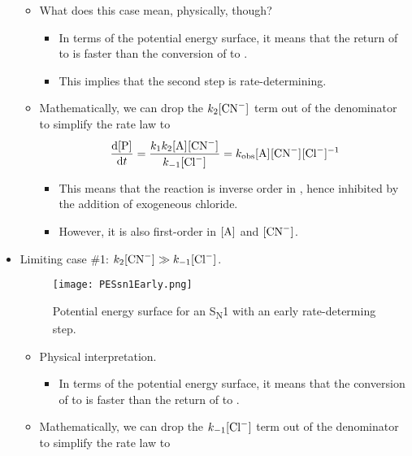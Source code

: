 \documentclass[../notes.tex]{subfiles}
\begin{document}
\begin{itemize}
\begin{figure}[H]
        \label{fig:PESsn1Late}
    \end{figure}
    \begin{itemize}
        \item What does this case mean, physically, though?
        \begin{itemize}
            \item In terms of the potential energy surface, it means that the return of  to  is faster than the conversion of  to .
            \item This implies that the second step is rate-determining.
        \end{itemize}
        \item Mathematically, we can drop the $k_2\cnc{CN-}$ term out of the denominator to simplify the rate law to
        \begin{equation*}
            \dv{\cnc{P}}{t} = \frac{k_1k_2\cnc{A}\cnc{CN-}}{k_{-1}\cnc{Cl-}}
            = \kobs\cnc{A}\cnc{CN-}\cnc{Cl-}^{-1}
        \end{equation*}
        \begin{itemize}
            \item This means that the reaction is inverse order in , hence inhibited by the addition of exogeneous chloride.
            \item However, it is also first-order in $\cnc{A}$ and $\cnc{CN-}$.
        \end{itemize}
    \end{itemize}
    \item Limiting case \#1: $k_2\cnc{CN-}\gg k_{-1}\cnc{Cl-}$.
    \begin{figure}[h!]
        \centering
        \texttt{[image: PESsn1Early.png]}
        \caption{Potential energy surface for an S\textsubscript{N}1 with an early rate-determing step.}
        \label{fig:PESsn1Early}
    \end{figure}
    \begin{itemize}
        \item Physical interpretation.
        \begin{itemize}
            \item In terms of the potential energy surface, it means that the conversion of  to  is faster than the return of  to .
        \end{itemize}
        \item Mathematically, we can drop the $k_{-1}\cnc{Cl-}$ term out of the denominator to simplify the rate law to

\end{itemize}
\end{itemize}
\end{document}
